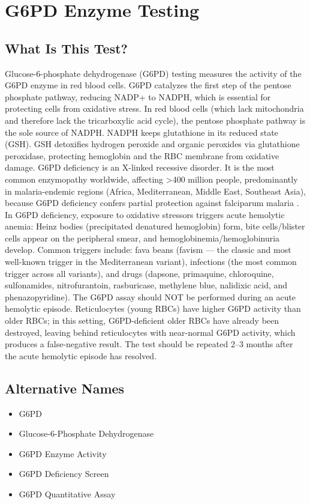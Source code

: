 \chapter{G6PD Enzyme Testing}
\section*{What Is This Test?}
Glucose-6-phosphate dehydrogenase (G6PD) testing measures the activity of the G6PD enzyme in red blood cells. G6PD catalyzes the first step of the pentose phosphate pathway, reducing NADP+ to NADPH, which is essential for protecting cells from oxidative stress. In red blood cells (which lack mitochondria and therefore lack the tricarboxylic acid cycle), the pentose phosphate pathway is the sole source of NADPH. NADPH keeps glutathione in its reduced state (GSH). GSH detoxifies hydrogen peroxide and organic peroxides via glutathione peroxidase, protecting hemoglobin and the RBC membrane from oxidative damage. G6PD deficiency is an X-linked recessive disorder. It is the most common enzymopathy worldwide, affecting >400 million people, predominantly in malaria-endemic regions (Africa, Mediterranean, Middle East, Southeast Asia), because G6PD deficiency confers partial protection against falciparum malaria \cite{luzzatto2020glucose,ruwende1998glucose}. In G6PD deficiency, exposure to oxidative stressors triggers acute hemolytic anemia: Heinz bodies (precipitated denatured hemoglobin) form, bite cells/blister cells appear on the peripheral smear, and hemoglobinemia/hemoglobinuria develop. Common triggers include: fava beans (favism --- the classic and most well-known trigger in the Mediterranean variant), infections (the most common trigger across all variants), and drugs (dapsone, primaquine, chloroquine, sulfonamides, nitrofurantoin, rasburicase, methylene blue, nalidixic acid, and phenazopyridine). The G6PD assay should NOT be performed during an acute hemolytic episode. Reticulocytes (young RBCs) have higher G6PD activity than older RBCs; in this setting, G6PD-deficient older RBCs have already been destroyed, leaving behind reticulocytes with near-normal G6PD activity, which produces a false-negative result. The test should be repeated 2--3 months after the acute hemolytic episode has resolved.
\section*{Alternative Names}
\begin{itemize}
  \item G6PD
  \item Glucose-6-Phosphate Dehydrogenase
  \item G6PD Enzyme Activity
  \item G6PD Deficiency Screen
  \item G6PD Quantitative Assay
\end{itemize}
